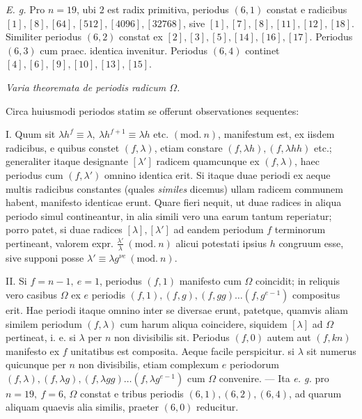 \textit{E. g.} Pro \(n=19\), ubi \(2\) est radix primitiva, periodus \((6,\allowbreak 1)\) constat e radicibus \([1],\allowbreak [8],\allowbreak [64],\allowbreak [512],\allowbreak [4096],\allowbreak [32768]\), sive \([1],\allowbreak [7],\allowbreak [8],\allowbreak [11],\allowbreak [12],\allowbreak [18]\). Similiter periodus \((6,\allowbreak 2)\) constat ex \([2],\allowbreak [3],\allowbreak [5],\allowbreak [14],\allowbreak [16],\allowbreak [17]\). Periodus \((6,\allowbreak 3)\) cum praec. identica invenitur. Periodus \((6,\allowbreak 4)\) continet \([4],\allowbreak [6],\allowbreak [9],\allowbreak [10],\allowbreak [13],\allowbreak [15]\).

\begin{center}\textit{Varia theoremata de periodis radicum \(\Omega\).}\end{center}


Circa huiusmodi periodos statim se offerunt observationes sequentes:

I. Quum sit \(\lambda h^f\equiv\lambda,\allowbreak \ \lambda h^{f+1}\equiv\lambda h\) etc. \((\mathrm{mod.}\ n)\), manifestum est, ex iisdem radicibus, e quibus constet \((f,\allowbreak \lambda)\), etiam constare \((f,\allowbreak \lambda h),\allowbreak (f,\allowbreak \lambda hh)\) etc.; generaliter itaque designante \([\lambda']\) radicem quamcunque ex \((f,\allowbreak \lambda)\), haec periodus cum \((f,\allowbreak \lambda')\) omnino identica erit. Si itaque duae periodi ex aeque multis radicibus constantes (quales \textit{similes} dicemus) ullam radicem communem habent, manifesto identicae erunt. Quare fieri nequit, ut duae radices in aliqua periodo simul contineantur, in alia simili vero una earum tantum reperiatur; porro patet, si duae radices \([\lambda],\allowbreak [\lambda']\) ad eandem periodum \(f\) terminorum pertineant, valorem expr. \(\frac{\lambda'}{\lambda}\ (\mathrm{mod.}\ n)\) alicui potestati ipsius \(h\) congruum esse, sive supponi posse \(\lambda'\equiv\lambda g^{\nu e}\ (\mathrm{mod.}\ n)\).

II. Si \(f=n-1,\allowbreak \ e=1\), periodus \((f,\allowbreak 1)\) manifesto cum \(\Omega\) coincidit; in reliquis vero casibus \(\Omega\) ex \(e\) periodis \((f,\allowbreak 1),\allowbreak (f,\allowbreak g),\allowbreak (f,\allowbreak gg)\ldots(f,\allowbreak g^{e-1})\) compositus erit. Hae periodi itaque omnino inter se diversae erunt, patetque, quamvis aliam similem periodum \((f,\allowbreak \lambda)\) cum harum aliqua coincidere, siquidem \([\lambda]\) ad \(\Omega\) pertineat, i. e. si \(\lambda\) per \(n\) non divisibilis sit. Periodus \((f,\allowbreak 0)\) autem aut \((f,\allowbreak kn)\) manifesto ex \(f\) unitatibus est composita. Aeque facile perspicitur.
si \(\lambda\) sit numerus quicunque per \(n\) non divisibilis, etiam complexum \(e\) periodorum \((f,\allowbreak \lambda),\allowbreak (f,\allowbreak \lambda g),\allowbreak (f,\allowbreak \lambda gg)\ldots(f,\allowbreak \lambda g^{e-1})\) cum \(\Omega\) convenire. — Ita \textit{e. g.} pro \(n=19,\allowbreak \ f=6\), \(\Omega\) constat e tribus periodis \((6,\allowbreak 1),\allowbreak (6,\allowbreak 2),\allowbreak (6,\allowbreak 4)\), ad quarum aliquam quaevis alia similis, praeter \((6,\allowbreak 0)\) reducitur.

